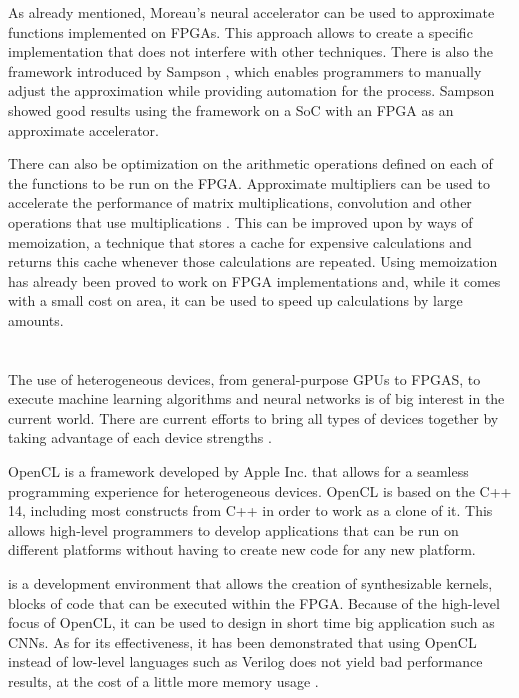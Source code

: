 As already mentioned, Moreau's neural accelerator can be used to approximate functions implemented
on FPGAs. This approach allows to create a specific implementation that does not interfere
with other techniques. There is also the framework introduced by Sampson \cite{sampson2015accept},
which enables programmers to manually adjust the approximation while providing automation
for the process. Sampson showed good results using the framework on a SoC with an FPGA as an
approximate accelerator.

There can also be optimization on the arithmetic operations defined on each of the functions
to be run on the FPGA. Approximate multipliers can be used to accelerate the performance
of matrix multiplications, convolution and other operations that use multiplications
\cite{ullah2018smapproxlib}. This can be improved upon by ways of memoization, a technique
that stores a cache for expensive calculations and returns this cache whenever those
calculations are repeated. Using memoization has already been proved to work on FPGA
implementations \cite{sinha2016low} and, while it comes with a small cost on area, it can be used to speed
up calculations by large amounts.

\section{\intelOCLnos}

The use of heterogeneous devices, from general-purpose GPUs to FPGAS, to execute 
machine learning algorithms and neural networks
is of big interest in the current world. There are current efforts to bring
all types of devices together by taking
advantage of each device strengths \cite{abadi2016tensorflow}.

OpenCL is a framework developed by Apple Inc. that allows for a seamless
programming experience for heterogeneous devices. OpenCL is based on 
the C++ 14, including most constructs from C++ in order to work as a
clone of it. This allows high-level programmers to develop applications
that can be run on different platforms without having to create new code
for any new platform.

\intelOCLnos is a development environment that allows the creation of
synthesizable kernels, blocks of code that can be executed within the FPGA.
Because of the high-level focus of OpenCL, it can be used to design in short
time big application such as CNNs. As for its effectiveness, it has been
demonstrated that using OpenCL instead of low-level languages such as Verilog
does not yield bad performance results, at the cost of a little more memory
usage \cite{abdelfattah2014gzip}.

